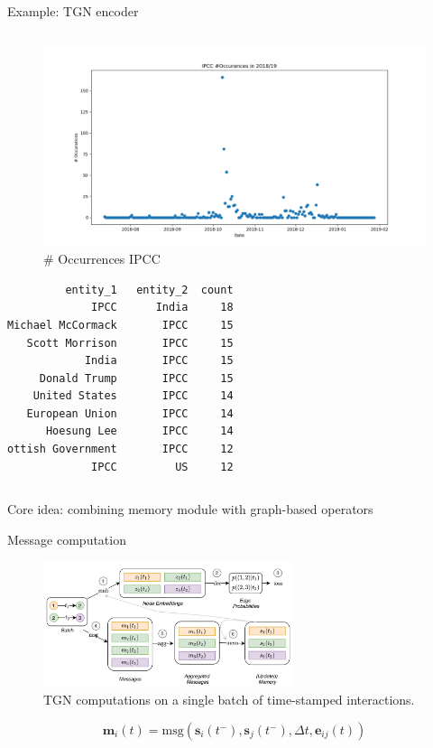 \documentclass[
  8pt,
  ignorenonframetext,
  aspectratio=43,
]{beamer}
\begin{document}
\begin{frame}[fragile]{Example: TGN encoder}
{\begin{columns}[T]
  \begin{column}{0.48\textwidth}
  \begin{figure}
  \centering
  \includegraphics{ipcc_2018.png}
  \caption{\# Occurrences IPCC}
  \end{figure}

\begin{Verbatim}
         entity_1   entity_2  count
             IPCC      India     18
Michael McCormack       IPCC     15
   Scott Morrison       IPCC     15
            India       IPCC     15
     Donald Trump       IPCC     15
    United States       IPCC     14
   European Union       IPCC     14
      Hoesung Lee       IPCC     14
ottish Government       IPCC     12
             IPCC         US     12
\end{Verbatim}
  \end{column}
  \end{columns}}

Core idea: combining memory module with graph-based operators
\end{frame}

\begin{frame}{Message computation}
\protect\hypertarget{message-computation}{}
\begin{figure}
\centering
\includegraphics[width=0.65\textwidth,height=\textheight]{tgn_computations.png}
\caption{TGN computations on a single batch of time-stamped
interactions.}
\end{figure}

\[
\mathbf{m}_i(t) = \mathrm{msg}\left(\mathbf{s}_i(t^-), \mathbf{s}_j(t^-), \Delta t, \mathbf{e}_{ij}(t)\right)
\]
\end{frame}
\end{document}
